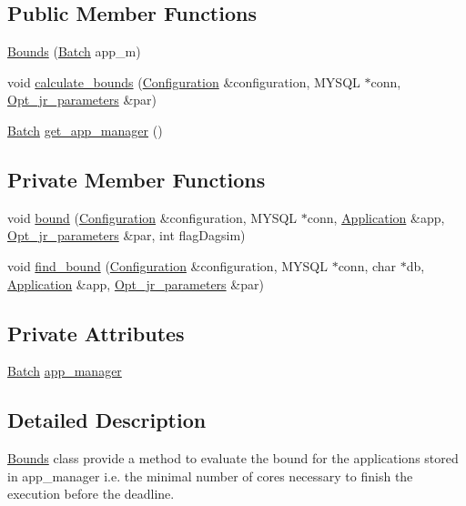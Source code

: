 \subsection*{Public Member Functions}
\begin{DoxyCompactItemize}
\item 
\hyperlink{classBounds_a57a9894ee450eb885a83e884b5fb79e7}{Bounds} (\hyperlink{classBatch}{Batch} app\-\_\-m)
\item 
void \hyperlink{classBounds_a525c2a8bf52889857306bf77d698ecd1}{calculate\-\_\-bounds} (\hyperlink{classConfiguration}{Configuration} \&configuration, M\-Y\-S\-Q\-L $\ast$conn, \hyperlink{classOpt__jr__parameters}{Opt\-\_\-jr\-\_\-parameters} \&par)
\item 
\hyperlink{classBatch}{Batch} \hyperlink{classBounds_aefebbfe17ca3a7d6a0f6cbf4a0bf2782}{get\-\_\-app\-\_\-manager} ()
\end{DoxyCompactItemize}
\subsection*{Private Member Functions}
\begin{DoxyCompactItemize}
\item 
void \hyperlink{classBounds_ae6633e291f145a0933f801541843cc1b}{bound} (\hyperlink{classConfiguration}{Configuration} \&configuration, M\-Y\-S\-Q\-L $\ast$conn, \hyperlink{classApplication}{Application} \&app, \hyperlink{classOpt__jr__parameters}{Opt\-\_\-jr\-\_\-parameters} \&par, int flag\-Dagsim)
\item 
void \hyperlink{classBounds_a600b0f815df6e0142de1b44f1aa795d7}{find\-\_\-bound} (\hyperlink{classConfiguration}{Configuration} \&configuration, M\-Y\-S\-Q\-L $\ast$conn, char $\ast$db, \hyperlink{classApplication}{Application} \&app, \hyperlink{classOpt__jr__parameters}{Opt\-\_\-jr\-\_\-parameters} \&par)
\end{DoxyCompactItemize}
\subsection*{Private Attributes}
\begin{DoxyCompactItemize}
\item 
\hyperlink{classBatch}{Batch} \hyperlink{classBounds_a9b463c00e877b6bf67d9e1ff4f36950b}{app\-\_\-manager}
\end{DoxyCompactItemize}


\subsection{Detailed Description}
\hyperlink{classBounds}{Bounds} class provide a method to evaluate the bound for the applications stored in app\-\_\-manager i.\-e. the minimal number of cores necessary to finish the execution before the deadline. 

